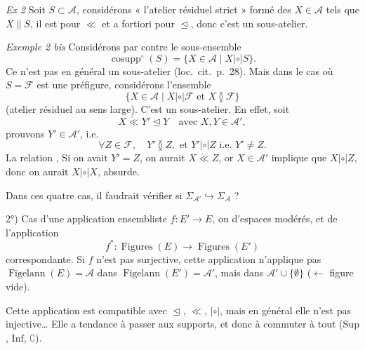 \documentclass[11pt,a4paper]{article}
\begin{document}
\textit{Ex 2} Soit $S \subset \mathcal{A}$, considérons « l'atelier résiduel strict » formé des $X \in \mathcal{A}$ tels que $X \mathrel{\|} S$, il est \struck{\ill{}}  pour $\ll$ et a fortiori pour $\trianglelefteq$, donc c'est un sous-atelier.

\textit{Exemple 2 bis} Considérons par contre le sous-ensemble
\[
  \operatorname{cosupp}^{\circ}(S) = \{ X \in \mathcal{A} \mid X \mathrel{|{\circ}|} S \}.
\]
Ce n'est pas en général un sous-atelier (loc.\ cit.\ p.~28). Mais dans le cas où $S = \mathcal{F}$ est une préfigure, considérons l'ensemble 
\[
  \{ X \in \mathcal{A} \mid X \mathrel{|{\circ}|} \mathcal{F} \text{ et } X \between \mathcal{F} \}
\]
(atelier résiduel au sens large). C'est un sous-atelier. En effet, soit
\[
  X \mathrel{\mathring{\ll}} Y' \trianglelefteq Y \quad \text{avec } X, Y \in \mathcal{A}',
\]
prouvons $Y' \in \mathcal{A}'$, i.e.
\[
  \forall Z \in \mathcal{F}, \quad Y' \between Z, \text{ et } Y' \mathrel{|{\circ}|} Z \text{ i.e. } Y' \neq Z .
\]
La relation ,  Si on avait $Y' = Z$, on aurait $X \mathrel{\mathring{\ll}} Z$, or $X \in \mathcal{A}'$ implique que $X \mathrel{|{\circ}|} Z$, donc on aurait $X \mathrel{|{\circ}|} X$, absurde.

Dans ces quatre cas, il faudrait vérifier si $\Sigma_{\mathcal{A}'} \hookrightarrow \Sigma_{\mathcal{A}}$ ?


2°) Cas d'une application ensembliste  $f : E' \to E$, ou d'espaces modérés, \add{\ill{}} et de l'application
\[
  f^{*} : \operatorname{Figures}(E) \longrightarrow \operatorname{Figures}(E')
\]
correspondante. Si $f$ n'est pas surjective, cette application n'applique pas $\operatorname{Figelann}(E) = \mathcal{A}$ dans $\operatorname{Figelann}(E') = \mathcal{A}'$, mais dans  $\mathcal{A}' \cup \{\emptyset\}$ \quad ($\leftarrow$ figure vide).


\marginal{\ill{}}

Cette application est compatible avec $\trianglelefteq$, $\mathring{\ll}$, $|{\circ}|$, mais en général elle n'est pas injective… Elle a tendance à passer aux supports, et donc à commuter à tout ($\mathrm{Sup}$, $\mathrm{Inf}$, $\complement$).
\end{document}
